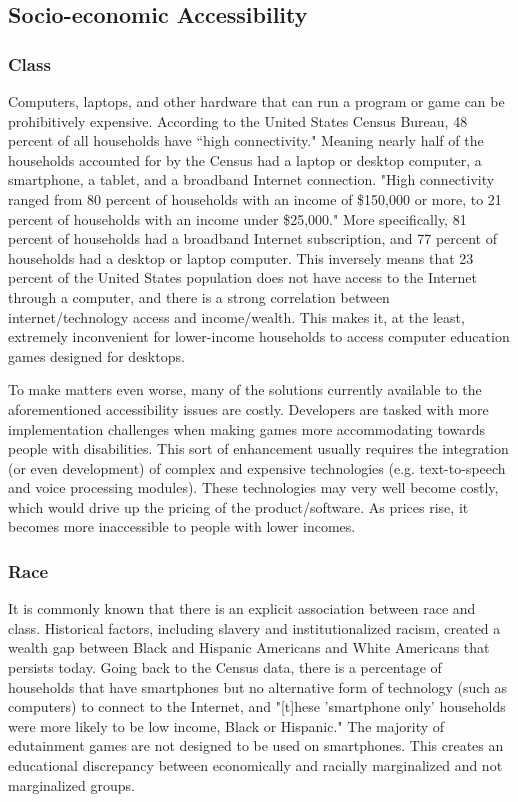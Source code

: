 \documentclass[10pt,twocolumn]{article}
\begin{document}
\subsection{Socio-economic Accessibility}
\subsubsection{Class}
Computers, laptops, and other hardware that can run a program or game can be prohibitively expensive. According to the United States Census Bureau, 48 percent of all households have “high connectivity." \cite{ryan2017computer} Meaning nearly half of the households accounted for by the Census had a laptop or desktop computer, a smartphone, a tablet, and a broadband Internet connection. "High connectivity ranged from 80 percent of households with an income of \$150,000 or more, to 21 percent of households with an income under \$25,000." \cite{ryan2017computer} More specifically, 81 percent of households had a broadband Internet subscription, and 77 percent of households had a desktop or laptop computer. \cite{ryan2017computer} This inversely means that 23 percent of the United States population does not have access to the Internet through a computer, and there is a strong correlation between internet/technology access and income/wealth. This makes it, at the least, extremely inconvenient for lower-income households to access computer education games designed for desktops. 

    To make matters even worse, many of the solutions currently available to the aforementioned accessibility issues are costly. Developers are tasked with more implementation challenges when making games more accommodating towards people with disabilities. This sort of enhancement usually requires the integration (or even development) of complex and expensive technologies (e.g. text-to-speech and voice processing modules). \cite{torrente2014towards} These technologies may very well become costly, which would drive up the pricing of the product/software. As prices rise, it becomes more inaccessible to people with lower incomes.


\subsubsection{Race}
    It is commonly known that there is an explicit association between race and class. Historical factors, including slavery and institutionalized racism, created a wealth gap between Black and Hispanic Americans and White Americans that persists today. Going back to the Census data, there is a percentage of households that have smartphones but no alternative form of technology (such as computers) to connect to the Internet, and "[t]hese 'smartphone only' households were more likely to be low income, Black or Hispanic." \cite{brown2019wealthy} The majority of edutainment games are not designed to be used on smartphones. This creates an educational discrepancy between economically and racially marginalized and not marginalized groups.
\end{document}
